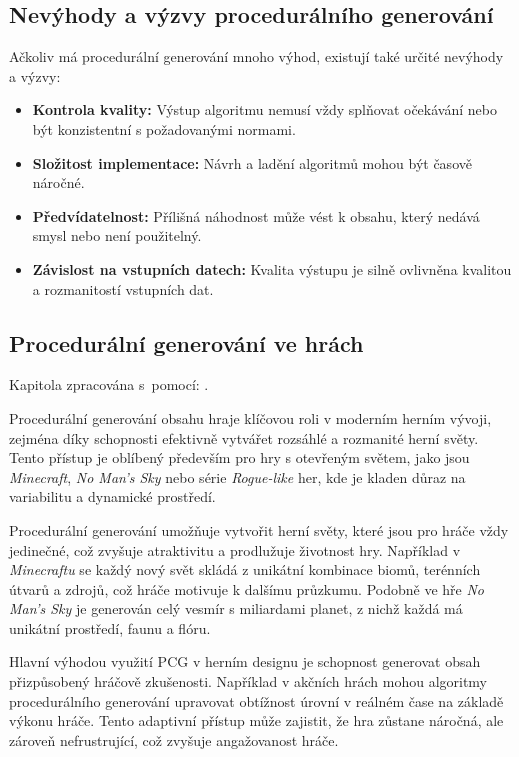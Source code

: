 \subsection{Nevýhody a výzvy procedurálního generování}
Ačkoliv má procedurální generování mnoho výhod, existují také určité nevýhody a výzvy:
\begin{itemize}
    \item \textbf{Kontrola kvality:} Výstup algoritmu nemusí vždy splňovat očekávání nebo být konzistentní s požadovanými normami.
    \item \textbf{Složitost implementace:} Návrh a ladění algoritmů mohou být časově náročné.
    \item \textbf{Předvídatelnost:} Přílišná náhodnost může vést k obsahu, který nedává smysl nebo není použitelný.
    \item \textbf{Závislost na vstupních datech:} Kvalita výstupu je silně ovlivněna kvalitou a rozmanitostí vstupních dat.
\end{itemize}

\subsection{Procedurální generování ve hrách}

Kapitola zpracována s~pomocí: \cite{PCGinG} \cite{HistoryOfPCG}.

Procedurální generování obsahu hraje klíčovou roli v moderním herním vývoji, zejména díky schopnosti efektivně vytvářet rozsáhlé a rozmanité herní světy. Tento přístup je oblíbený především pro hry s otevřeným světem, jako jsou \emph{Minecraft}, \emph{No Man's Sky} nebo série \emph{Rogue-like} her, kde je kladen důraz na variabilitu a dynamické prostředí.

Procedurální generování umožňuje vytvořit herní světy, které jsou pro hráče vždy jedinečné, což zvyšuje atraktivitu a prodlužuje životnost hry. Například v \emph{Minecraftu} se každý nový svět skládá z unikátní kombinace biomů, terénních útvarů a zdrojů, což hráče motivuje k dalšímu průzkumu. Podobně ve hře \emph{No Man's Sky} je generován celý vesmír s miliardami planet, z nichž každá má unikátní prostředí, faunu a flóru.

Hlavní výhodou využití PCG v herním designu je schopnost generovat obsah přizpůsobený hráčově zkušenosti. Například v akčních hrách mohou algoritmy procedurálního generování upravovat obtížnost úrovní v reálném čase na základě výkonu hráče. Tento adaptivní přístup může zajistit, že hra zůstane náročná, ale zároveň nefrustrující, což zvyšuje angažovanost hráče.

